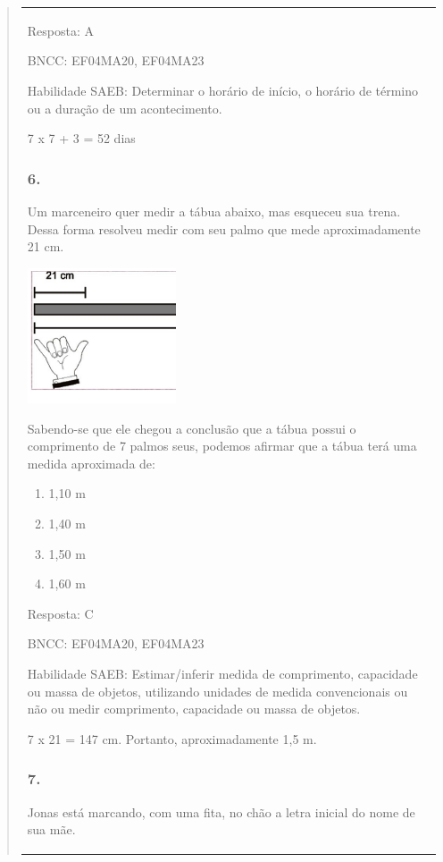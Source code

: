 \begin{enumerate}
\begin{escolha}
\begin{enumerate}
\begin{itemize}
\begin{itemize}
\begin{escolha}
\begin{quote}
\begin{escolha}
{\begin{longtable}[]{@{}l@{}}
\begin{itemize}
Resposta: A

BNCC: EF04MA20, EF04MA23

Habilidade SAEB: Determinar o horário de início, o horário de término ou
a duração de um acontecimento.

7 x 7 + 3 = 52 dias

\subsubsection{6.}\label{section-162}

Um marceneiro quer medir a tábua abaixo, mas esqueceu sua trena. Dessa
forma resolveu medir com seu palmo que mede aproximadamente 21 cm.

\includegraphics[width=1.73077in,height=1.57654in]{media/image154.png}

Sabendo-se que ele chegou a conclusão que a tábua possui o comprimento
de 7 palmos seus, podemos afirmar que a tábua terá uma medida aproximada
de:

\begin{enumerate}
\def\labelenumi{\alph{enumi})}
\item
  1,10 m
\item
  1,40 m
\item
  1,50 m
\item
  1,60 m
\end{enumerate}

Resposta: C

BNCC: EF04MA20, EF04MA23

Habilidade SAEB: Estimar/inferir medida de comprimento, capacidade ou
massa de objetos, utilizando unidades de medida convencionais ou não ou
medir comprimento, capacidade ou massa de objetos.

7 x 21 = 147 cm. Portanto, aproximadamente 1,5 m.

\subsubsection{7.}\label{section-163}

Jonas está marcando, com uma fita, no chão a letra inicial do nome de
sua mãe.


\end{itemize}
\end{longtable}}
\end{escolha}
\end{quote}
\end{escolha}
\end{itemize}
\end{itemize}
\end{enumerate}
\end{escolha}
\end{enumerate}
